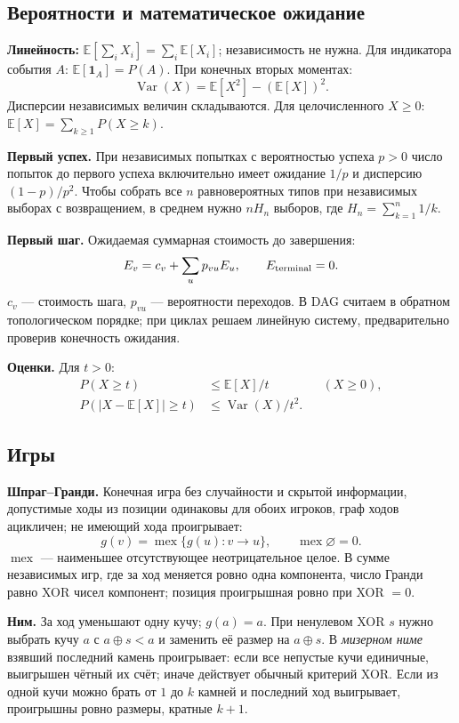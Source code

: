 \subsection{Вероятности и математическое ожидание}
\textbf{Линейность:} $\mathbb E[\sum_i X_i]=\sum_i\mathbb E[X_i]$; независимость не нужна. Для индикатора события $A$: $\mathbb E[\mathbf1_A]=P(A)$.
При конечных вторых моментах:
\[
  \operatorname{Var}(X)=\mathbb E[X^2]-(\mathbb E[X])^2.
\]
Дисперсии независимых величин складываются.
Для целочисленного $X\ge0$: $\mathbb E[X]=\sum_{k\ge1}P(X\ge k)$.

\textbf{Первый успех.} При независимых попытках с вероятностью успеха $p>0$ число попыток до первого успеха включительно имеет ожидание $1/p$ и дисперсию $(1-p)/p^2$.
Чтобы собрать все $n$ равновероятных типов при независимых выборах с возвращением, в среднем нужно $nH_n$ выборов, где $H_n=\sum_{k=1}^n1/k$.

\textbf{Первый шаг.} Ожидаемая суммарная стоимость до завершения:
\[
  E_v=c_v+\sum_u p_{vu}E_u,\qquad E_{\rm terminal}=0.
\]
$c_v$ --- стоимость шага, $p_{vu}$ --- вероятности переходов. В DAG считаем в обратном топологическом порядке; при циклах решаем линейную систему, предварительно проверив конечность ожидания.

\textbf{Оценки.} Для $t>0$:
\[
  \begin{aligned}
    P(X\ge t)&\le\mathbb E[X]/t &&(X\ge0),\\
    P(|X-\mathbb E[X]|\ge t)&\le\operatorname{Var}(X)/t^2.
  \end{aligned}
\]

\subsection{Игры}
\textbf{Шпраг--Гранди.} Конечная игра без случайности и скрытой информации, допустимые ходы из позиции одинаковы для обоих игроков, граф ходов ацикличен; не имеющий хода проигрывает:
\[
  g(v)=\operatorname{mex}\{g(u):v\to u\},\qquad
  \operatorname{mex}\varnothing=0.
\]
$\operatorname{mex}$ --- наименьшее отсутствующее неотрицательное целое. В сумме независимых игр, где за ход меняется ровно одна компонента, число Гранди равно XOR чисел компонент; позиция проигрышная ровно при XOR $=0$.

\textbf{Ним.} За ход уменьшают одну кучу; $g(a)=a$. При ненулевом XOR $s$ нужно выбрать кучу $a$ с $a\mathbin{\oplus}s<a$ и заменить её размер на $a\mathbin{\oplus}s$.
В \emph{мизерном ниме} взявший последний камень проигрывает: если все непустые кучи единичные, выигрышен чётный их счёт; иначе действует обычный критерий XOR.
Если из одной кучи можно брать от $1$ до $k$ камней и последний ход выигрывает, проигрышны ровно размеры, кратные $k+1$.

